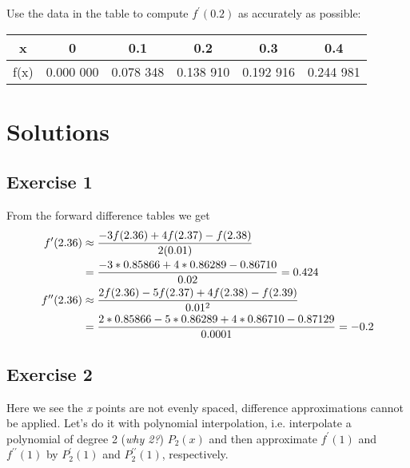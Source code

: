 \documentclass[12pt]{article}
\newenvironment{exercise}[2][Exercise]{\begin{trivlist}
\item[\hskip \labelsep {\bfseries #1}\hskip \labelsep {\bfseries #2.}]}{\end{trivlist}}
\begin{document}
  \begin{exercise}{4}
  Use the data in the table to compute $f^\prime (0.2)$ as accurately as possible:
  \begin{table}[h]
    \centering
    \begin{tabular}{|c|c|c|c|c|c|}
      \hline
      x &0& 0.1& 0.2& 0.3& 0.4\\ \hline
      f(x)& 0.000 000& 0.078 348 &0.138 910& 0.192 916 &0.244 981 \\ \hline
    \end{tabular}
  \end{table}
\end{exercise}

\break

\section{Solutions}

\subsection{Exercise 1}

From the forward difference tables we get
\begin{align}
f^\prime(2.36) &\approx \frac{-3f(2.36) + 4f(2.37) - f(2.38)}{2(0.01)} \notag \\
&= \frac{-3*0.85866 + 4*0.86289-0.86710}{0.02} = 0.424 \notag \\
f^ {\prime \prime}(2.36) &\approx \frac{2f(2.36) -5f(2.37) + 4f(2.38) - f(2.39)}{0.01^2} \notag \\
&= \frac{2*0.85866 -5*0.86289+4*0.86710-0.87129}{0.0001} = -0.2 \notag
\end{align}

\subsection{Exercise 2}

Here we see the \textit{x} points are not evenly spaced, difference approximations cannot be applied.
Let's do it with polynomial interpolation, i.e. interpolate a polynomial of degree 2 (\textit{why 2?}) $P_2(x)$ and then approximate  \(f^\prime (1)\) and \(f^{\prime \prime} (1)\) by \(P_2^\prime (1)\) and \(P_2^{\prime \prime} (1)\), respectively.
\end{document}
